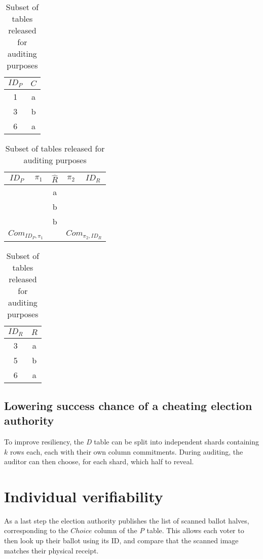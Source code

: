 \begin{table}
	\centering
	\begin{subtable}{.2\linewidth}
	\end{subtable}%
		\centering
		\begin{tabular}{|c|c|}
			\hline
			$ID_P$ & $C$ \\
			\hline
			1 & a \\
			3 & b \\
			6 & a \\
			\hline
		\end{tabular}
	\begin{subtable}{.6\linewidth}
		\centering
		\begin{tabular}{|c|c|c|c|c|}
			\hline
			$ID_P$ & $\pi_1$ & $\hat{R}$ & $\pi_2$ & $ID_R$ \\
			\hline
			  &                     & a &                     &   \\
			  &                     & b &                     &   \\
			  &                     & b &                     &   \\
			\hline
			\multicolumn{2}{|c|}{$Com_{ID_P, \pi_1}$} &   & \multicolumn{2}{c|}{$Com_{\pi_2, ID_R}$} \\
			\hline
		\end{tabular}
	\end{subtable}
	\begin{subtable}{.2\linewidth}
		\centering
		\begin{tabular}{|c|c|}
			\hline
			$ID_R$ & $R$ \\
			\hline
			3 & a \\
			5 & b \\
			6 & a \\
			\hline
		\end{tabular}
	\end{subtable}
	\caption{Subset of tables released for auditing purposes}
	\label{tbl:decryption_audit}
\end{table}

\subsection{Lowering success chance of a cheating election authority}

To improve resiliency, the \emph{D} table can be split into independent shards
containing $k$ rows each, each with their own column commitments. During
auditing, the auditor can then choose, for each shard, which half to reveal.

\section{Individual verifiability}

As a last step the election authority publishes the list of scanned ballot
halves, corresponding to the $Choice$ column of the \emph{P} table. This allows
each voter to then look up their ballot using its ID, and compare that the
scanned image matches their physical receipt.
